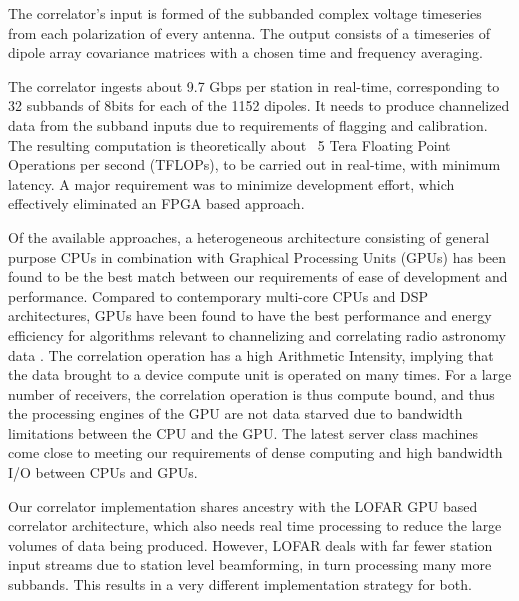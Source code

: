 \documentclass{ws-jai}
\begin{document}
The correlator's  input is  formed of the  subbanded complex  voltage timeseries
from each polarization of every antenna.  The output consists of a timeseries of
dipole array covariance matrices with a chosen time and frequency averaging.

The correlator ingests about 9.7 Gbps per station in real-time, corresponding to
32  subbands of  8bits  for each  of  the  1152 dipoles.   It  needs to  produce
channelized data  from the subband  inputs due  to requirements of  flagging and
calibration. The resulting  computation is theoretically about  ~5 Tera Floating
Point  Operations per  second (TFLOPs),  to be  carried out  in real-time,  with
minimum latency.  A major requirement  was to minimize development effort, which
effectively eliminated an FPGA based approach.

Of the available approaches, a  heterogeneous architecture consisting of general
purpose  CPUs in  combination with  Graphical Processing  Units (GPUs)  has been
found to be the  best match between our requirements of  ease of development and
performance.  Compared  to contemporary  multi-core CPUs and  DSP architectures,
GPUs have  been found  to have  the best performance  and energy  efficiency for
algorithms  relevant  to  channelizing  and  correlating  radio  astronomy  data
\cite{romein2016comparison}.  The  correlation operation  has a  high Arithmetic
Intensity, implying that  the data brought to a device  compute unit is operated
on many  times.  For a large  number of receivers, the  correlation operation is
thus compute  bound, and  thus the processing  engines of the  GPU are  not data
starved due  to bandwidth limitations between  the CPU and the  GPU.  The latest
server class machines come close to  meeting our requirements of dense computing
and high bandwidth I/O between CPUs and GPUs.

Our  correlator  implementation  shares  ancestry   with  the  LOFAR  GPU  based
correlator architecture,  which also  needs real time  processing to  reduce the
large  volumes of  data being  produced.  However,  LOFAR deals  with far  fewer
station input streams due to station  level beamforming, in turn processing many
more  subbands. This  results in  a very  different implementation  strategy for
both.


\end{document}

